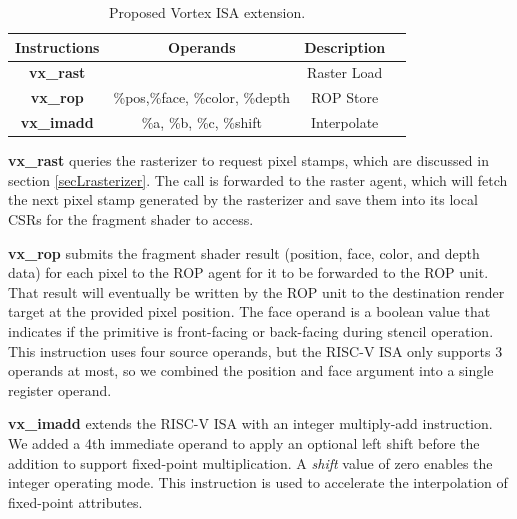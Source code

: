\documentclass{book}
\newcommand{\clearandresetpage}{%
  \clearpage
  \setcounter{page}{1}%
}
\newcommand{\name}{Vortex } %
\begin{document}
\begin{table}[h]

\centering


 \caption{Proposed \name ISA extension. }

\begin{tabular}{||c|c|c|c||}

 \hline

Instructions & Operands & Description \\

\hline\hline


 \textbf{vx\_rast} & & Raster Load \\

 \textbf{vx\_rop} & \%pos,\%face, \%color, \%depth & ROP Store\\

\textbf{vx\_imadd} & \%a, \%b, \%c, \%shift  & Interpolate \\
\hline
\end{tabular}
\label{table:isa}
\end{table}

{\textbf{vx\_rast}} queries the rasterizer to request pixel stamps, which are discussed in section \ref{secLrasterizer}. The call is forwarded to the raster agent, which will fetch the next pixel stamp generated by the rasterizer and save them into its local CSRs for the fragment shader to access.

\textbf{vx\_rop} submits the fragment shader result (position, face, color, and depth data) for each pixel to the ROP agent for it to be forwarded to the ROP unit. That result will eventually be written by the ROP unit to the destination render target at the provided pixel position. The face operand is a boolean value that indicates if the primitive is front-facing or back-facing during stencil operation. This instruction uses four source operands, but the RISC-V ISA only supports 3 operands at most, so we combined the position and face argument into a single register operand.

\textbf{vx\_imadd} extends the RISC-V ISA with an integer multiply-add instruction. We added a 4th immediate operand to apply an optional left shift before the addition to support fixed-point multiplication. A \textit{shift} value of zero enables the integer operating mode. This instruction is used to accelerate the interpolation of fixed-point attributes.
\clearandresetpage %
\end{document}
